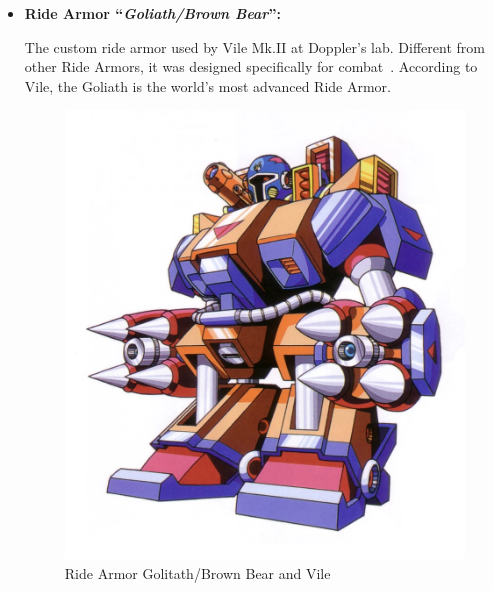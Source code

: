 \begin{itemize}
	\item \hypertarget{vehicle:Ride_Armor_Goliath}{\textbf{Ride Armor ``\textit{Goliath/Brown Bear}'':}} The custom ride armor used by Vile Mk.II at Doppler's lab. Different from 
	other Ride Armors, it was designed specifically for combat~\cite{wayback:X3_resources}. According to Vile, the Goliath is the world's most advanced Ride Armor.~\cite{book:MH_field_guide}
	\begin{figure}[htp]
		\centering
		\includegraphics[height=\portraitsize]{figures/X3/Doppler_stages/vile2_armor.png}
		\caption{Ride Armor Golitath/Brown Bear and Vile}
	\end{figure}
	

\end{itemize}
